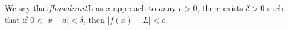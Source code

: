 \documentclass[preview]{standalone}
\begin{document}
\begin{center}
We say that$fhas a limit $L  as $x$ approach to $a$\Given any $\epsilon > 0$, there exists $\delta > 0$ such that if $0 < |x - a| < \delta$, then $|f(x) - L| < \epsilon$.
\end{center}
\end{document}
